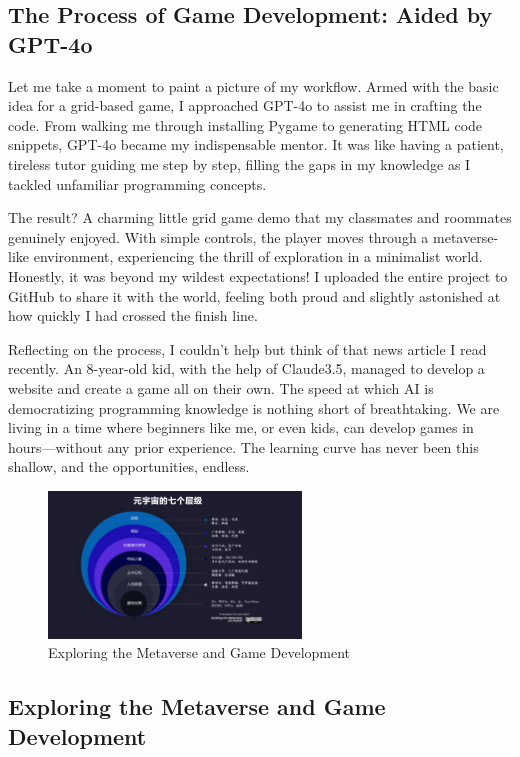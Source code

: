 \documentclass[a4paper]{article} 	%
\begin{document}
\subsection*{The Process of Game Development: Aided by GPT-4o}

Let me take a moment to paint a picture of my workflow. Armed with the basic idea for a grid-based game, I approached GPT-4o to assist me in crafting the code. From walking me through installing Pygame to generating HTML code snippets, GPT-4o became my indispensable mentor. It was like having a patient, tireless tutor guiding me step by step, filling the gaps in my knowledge as I tackled unfamiliar programming concepts.

The result? A charming little grid game demo that my classmates and roommates genuinely enjoyed. With simple controls, the player moves through a metaverse-like environment, experiencing the thrill of exploration in a minimalist world. Honestly, it was beyond my wildest expectations! I uploaded the entire project to GitHub to share it with the world, feeling both proud and slightly astonished at how quickly I had crossed the finish line.

Reflecting on the process, I couldn’t help but think of that news article I read recently. An 8-year-old kid, with the help of Claude3.5, managed to develop a website and create a game all on their own. The speed at which AI is democratizing programming knowledge is nothing short of breathtaking. We are living in a time where beginners like me, or even kids, can develop games in hours—without any prior experience. The learning curve has never been this shallow, and the opportunities, endless.

\begin{figure}[h!]
	\centering
	\includegraphics[width=0.6\textwidth]{fig004.png}  %
	\caption{Exploring the Metaverse and Game Development}
	\label{fig:003}
\end{figure}

\subsection*{Exploring the Metaverse and Game Development}
\end{document}
